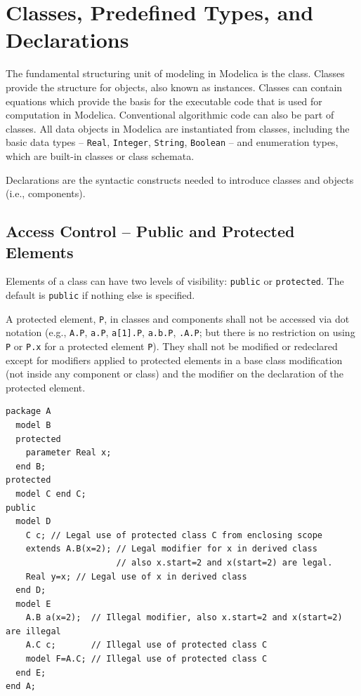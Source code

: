 \chapter{Classes, Predefined Types, and Declarations}\label{class-predefined-types-and-declarations}

The fundamental structuring unit of modeling in Modelica is the class.
Classes provide the structure for objects, also known as instances.
Classes can contain equations which provide the basis for the executable code that is used for computation in Modelica.
Conventional algorithmic code can also be part of classes.
All data objects in Modelica are instantiated from classes, including the basic data types -- \lstinline!Real!, \lstinline!Integer!, \lstinline!String!, \lstinline!Boolean! -- and enumeration types, which are built-in classes or class schemata.

Declarations are the syntactic constructs needed to introduce classes and objects (i.e., components).

\section{Access Control -- Public and Protected Elements}\label{access-control-public-and-protected-elements}

Elements of a class can have two levels of visibility: \lstinline!public! or \lstinline!protected!.
The default is \lstinline!public! if nothing else is specified.

A protected element, \lstinline!P!, in classes and components shall not be accessed via dot notation (e.g., \lstinline!A.P!, \lstinline!a.P!, \lstinline!a[1].P!, \lstinline!a.b.P!, \lstinline!.A.P!; but there is no restriction on using \lstinline!P! or \lstinline!P.x! for a protected element \lstinline!P!).
They shall not be modified or redeclared except for modifiers applied to protected elements in a base class modification (not inside any component or class) and the modifier on the declaration of the protected element.

\begin{example}
\begin{lstlisting}[language=modelica]
package A
  model B
  protected
    parameter Real x;
  end B;
protected
  model C end C;
public
  model D
    C c; // Legal use of protected class C from enclosing scope
    extends A.B(x=2); // Legal modifier for x in derived class
                      // also x.start=2 and x(start=2) are legal.
    Real y=x; // Legal use of x in derived class
  end D;
  model E
    A.B a(x=2);  // Illegal modifier, also x.start=2 and x(start=2) are illegal
    A.C c;       // Illegal use of protected class C
    model F=A.C; // Illegal use of protected class C
  end E;
end A;
\end{lstlisting}
\end{example}

